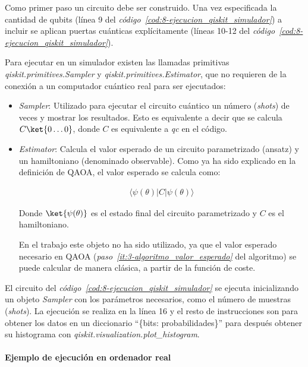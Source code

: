 Como primer paso un circuito debe ser construido.
Una vez especificada la cantidad de qubits (línea 9 del \textit{código~\ref{cod:8-ejecucion_qiskit_simulador}}) a incluir se aplican puertas cuánticas explícitamente (líneas 10{-}12 del \textit{código~\ref{cod:8-ejecucion_qiskit_simulador}}).

Para ejecutar en un simulador existen las llamadas primitivas \textit{qiskit.primitives.Sampler} y \textit{qiskit.primitives.Estimator}, que no requieren de la conexión a un computador cuántico real para ser ejecutados:
\begin{itemize}
\item \textit{Sampler}: Utilizado para ejecutar el circuito cuántico un número (\textit{shots}) de veces y mostrar los resultados.
  Esto es equivalente a decir que se calcula $C\ket{0 \ldots 0}$, donde $C$ es equivalente a \textit{qc} en el código.
  
\item \textit{Estimator}: Calcula el valor esperado de un circuito parametrizado (ansatz) y un hamiltoniano (denominado observable).
  Como ya ha sido explicado en la definición de QAOA, el valor esperado se calcula como:

  \begin{align}
    \langle \psi(\theta) \rvert C \lvert \psi(\theta) \rangle
  \end{align}

  Donde $\ket{\psi(\theta)}$ es el estado final del circuito parametrizado y $C$ es el hamiltoniano.

  En el trabajo este objeto no ha sido utilizado, ya que el valor esperado necesario en QAOA (\textit{paso~\ref{it:3-algoritmo_valor_esperado}} del algoritmo) se puede calcular de manera clásica, a partir de la función de coste.
\end{itemize}

El circuito del \textit{código~\ref{cod:8-ejecucion_qiskit_simulador}} se ejecuta inicializando un objeto \textit{Sampler} con los parámetros necesarios, como el número de muestras (\textit{shots}).
La ejecución se realiza en la línea 16 y el resto de instrucciones son para obtener los datos en un diccionario ``\{bits: probabilidades\}'' para después obtener su histograma con \textit{qiskit.visualization.plot\_histogram}.


\paragraph{Ejemplo de ejecución en ordenador real}

